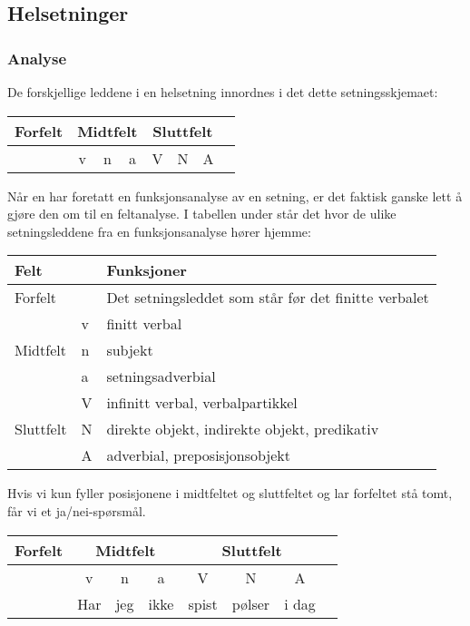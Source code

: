 \documentclass{article}
\begin{document}
\subsection{Helsetninger}
\subsubsection{Analyse}
De forskjellige leddene i en helsetning innordnes i det dette setningsskjemaet:

\begin{table}[!ht]
\begin{tabular}{|c|c|c|c|c|c|c|c|}
\hline
Forfelt & \multicolumn{3}{|c|}{Midtfelt} & \multicolumn{3}{|c|}{Sluttfelt}\\\hline
& v&n&a&V&N&A\\\hline

\end{tabular}
\end{table}


N{\aa}r en har foretatt en funksjonsanalyse av en setning, er det faktisk ganske lett {\aa} gj{\o}re den om til en feltanalyse. I tabellen under st{\aa}r det hvor de ulike setningsleddene fra en funksjonsanalyse h{\o}rer hjemme: %

\begin{table}[!ht]
\begin{tabular}{|l|l|l|}
\hline
{\bf Felt} & & {\bf Funksjoner}\\\hline
Forfelt & & Det setningsleddet som st{\aa}r f{\o}r det finitte verbalet\\\hline
&v & finitt verbal\\
Midtfelt &n & subjekt\\
&a & setningsadverbial\\\hline
&V & infinitt verbal, verbalpartikkel\\
Sluttfelt &N & direkte objekt, indirekte objekt, predikativ\\
&A & adverbial, preposisjonsobjekt\\\hline
\end{tabular}
\end{table}


Hvis vi kun fyller posisjonene i midtfeltet og sluttfeltet og lar forfeltet st{\aa} tomt, f{\aa}r vi et ja/nei-sp{\o}rsm{\aa}l. 

\begin{table}[!ht]
\begin{tabular}{|c|c|c|c|c|c|c|c|}
\hline
Forfelt & \multicolumn{3}{|c|}{Midtfelt} & \multicolumn{3}{|c|}{Sluttfelt}\\\hline
& v&n&a&V&N&A\\\hline
& Har &jeg& ikke & spist & p{\o}lser & i dag\\\hline
\end{tabular}
\end{table}
\end{document}

